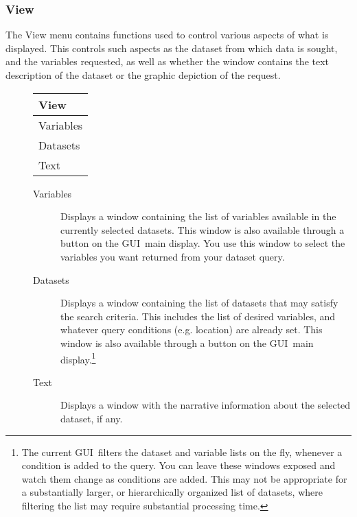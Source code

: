 \documentclass[10pt]{report}
\newcommand{\gui}{GUI}
\begin{document}
\subsubsection{View}
\label{sec:menu:View}
The View menu contains functions used to control various
aspects of what is displayed.  This controls such aspects as the
dataset from which data is sought, and the variables requested, as
well as whether the window contains the text description of the
dataset or the graphic depiction of the request.
\begin{description}
\item[] 
  \begin{center}
    \begin{tabular}[c]{|l|} \hline
      \textbf{View} \\ \hline
      Variables \\
      Datasets \\
      Text \\ \hline
    \end{tabular}
  \end{center}
  \begin{description}
  \item[Variables] Displays a window containing the list of variables
    available in the currently selected datasets. This window is also
    available through a  button on the \gui\ main
    display.  You use this window to select the variables you want
    returned from your dataset query.
  \item[Datasets] Displays a window containing the list of datasets
    that may satisfy the search criteria.  This includes the list of
    desired variables, and whatever query conditions (e.g. location)
    are already set.  This window is also available through a
     button on the \gui\ main display.\footnote{The
      current \gui\ filters the dataset and variable lists on the fly,
      whenever a condition is added to the query.  You can leave these
      windows exposed and watch them change as conditions are added.
      This may not be appropriate for a substantially larger, or
      hierarchically organized list of datasets, where filtering the
      list may require substantial processing time.}
  \item[Text] Displays a window with the narrative information about
    the selected dataset, if any.
  \end{description}
\end{description}
\end{document}
